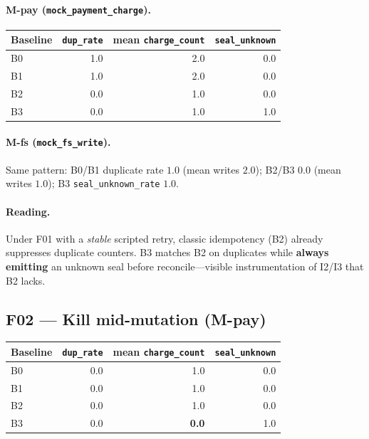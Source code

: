 \documentclass[11pt,a4paper]{article}
\begin{document}
\paragraph{M-pay (\texttt{mock\_payment\_charge}).}

\begin{center}
\begin{tabular}{@{}lrrr@{}}
\toprule
Baseline & \texttt{dup\_rate} & mean \texttt{charge\_count} &
  \texttt{seal\_unknown} \\
\midrule
B0 & 1.0 & 2.0 & 0.0 \\
B1 & 1.0 & 2.0 & 0.0 \\
B2 & 0.0 & 1.0 & 0.0 \\
B3 & 0.0 & 1.0 & 1.0 \\
\bottomrule
\end{tabular}
\end{center}

\paragraph{M-fs (\texttt{mock\_fs\_write}).}
Same pattern: B0/B1 duplicate rate $1.0$ (mean writes $2.0$); B2/B3 $0.0$
(mean writes $1.0$); B3 \texttt{seal\_unknown\_rate} $1.0$.

\paragraph{Reading.}
Under F01 with a \emph{stable} scripted retry, classic idempotency (B2)
already suppresses duplicate counters. B3 matches B2 on duplicates while
\textbf{always emitting} an unknown seal before reconcile---visible
instrumentation of I2/I3 that B2 lacks.

\subsection{F02 --- Kill mid-mutation (M-pay)}

\begin{center}
\begin{tabular}{@{}lrrr@{}}
\toprule
Baseline & \texttt{dup\_rate} & mean \texttt{charge\_count} &
  \texttt{seal\_unknown} \\
\midrule
B0 & 0.0 & 1.0 & 0.0 \\
B1 & 0.0 & 1.0 & 0.0 \\
B2 & 0.0 & 1.0 & 0.0 \\
B3 & 0.0 & \textbf{0.0} & 1.0 \\
\bottomrule
\end{tabular}
\end{center}
\end{document}
